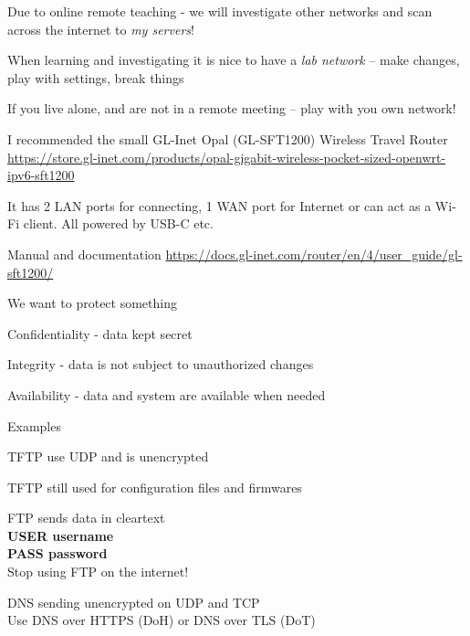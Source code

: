 \documentclass[Screen16to9,17pt]{foils}
\begin{document}
Due to online remote teaching - we will investigate other networks and scan across the internet to \emph{my servers}!



\begin{list2}
\item When learning and investigating it is nice to have a \emph{lab network} -- make changes, play with settings, break things
\item If you live alone, and are not in a remote meeting -- play with you own network!
\item I recommended the small GL-Inet Opal (GL-SFT1200) Wireless Travel Router\\
\url{https://store.gl-inet.com/products/opal-gigabit-wireless-pocket-sized-openwrt-ipv6-sft1200}
\item It has 2 LAN ports for connecting, 1 WAN port for Internet or can act as a Wi-Fi client. All powered by USB-C etc.
\item Manual and documentation \url{https://docs.gl-inet.com/router/en/4/user_guide/gl-sft1200/}
\end{list2}



\begin{list1}
\item We want to protect something
\item Confidentiality - data kept secret
\item Integrity - data is not subject to unauthorized changes
\item Availability - data and system are available when needed
\end{list1}


Examples
\begin{list2}
\item TFTP use UDP and is unencrypted
\item TFTP still used for configuration files and firmwares
\item FTP sends data in cleartext\\
{\bfseries USER username}\\
{\bfseries PASS password}\\
Stop using FTP on the internet!
\item DNS sending unencrypted on UDP and TCP\\
Use DNS over HTTPS (DoH) or DNS over TLS (DoT)
\end{list2}
\end{document}
